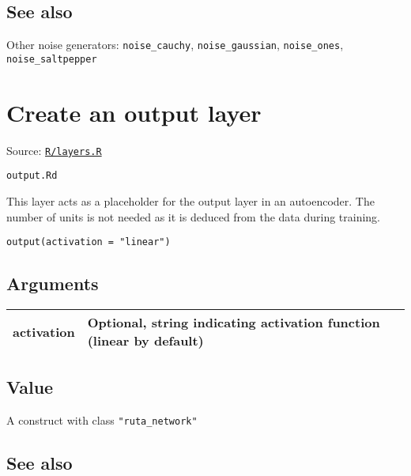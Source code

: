\hypertarget{see-also}{\subsection{\texorpdfstring{\protect\hyperlink{see-also}{}See
also}{See also}}\label{see-also}}

Other noise generators: \texttt{noise\_cauchy},
\texttt{noise\_gaussian}, \texttt{noise\_ones},
\texttt{noise\_saltpepper}

\section{Create an output layer}\label{create-an-output-layer}

Source:
\href{https://github.com/fdavidcl/ruta/blob/master/R/layers.R}{\texttt{R/layers.R}}

\texttt{output.Rd}

This layer acts as a placeholder for the output layer in an autoencoder.
The number of units is not needed as it is deduced from the data during
training.

\begin{verbatim}
output(activation = "linear")
\end{verbatim}

\hypertarget{arguments}{\subsection{\texorpdfstring{\protect\hyperlink{arguments}{}Arguments}{Arguments}}\label{arguments}}

\begin{longtable}[c]{@{}ll@{}}
\toprule
activation & Optional, string indicating activation function (linear by
default)\tabularnewline
\bottomrule
\end{longtable}

\hypertarget{value}{\subsection{\texorpdfstring{\protect\hyperlink{value}{}Value}{Value}}\label{value}}

A construct with class \texttt{"ruta\_network"}

\hypertarget{see-also}{\subsection{\texorpdfstring{\protect\hyperlink{see-also}{}See
also}{See also}}\label{see-also}}

